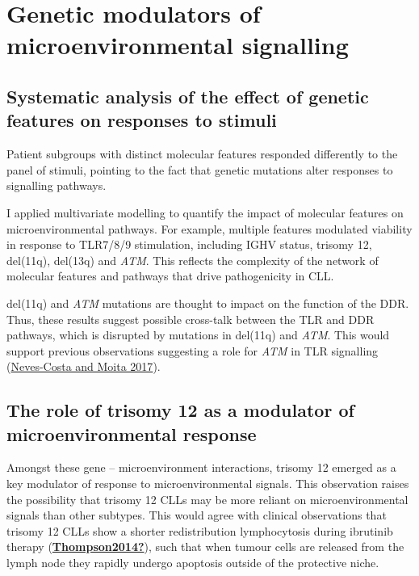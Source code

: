 \documentclass[11pt, a4paper, twosided]{book}
\begin{document}
\hypertarget{genetic-modulators-of-microenvironmental-signalling}{%
\section{Genetic modulators of microenvironmental signalling}\label{genetic-modulators-of-microenvironmental-signalling}}

\hypertarget{systematic-analysis-of-the-effect-of-genetic-features-on-responses-to-stimuli-1}{%
\subsection{Systematic analysis of the effect of genetic features on responses to stimuli}\label{systematic-analysis-of-the-effect-of-genetic-features-on-responses-to-stimuli-1}}

Patient subgroups with distinct molecular features responded differently to the panel of stimuli, pointing to the fact that genetic mutations alter responses to signalling pathways.

I applied multivariate modelling to quantify the impact of molecular features on microenvironmental pathways. For example, multiple features modulated viability in response to TLR7/8/9 stimulation, including IGHV status, trisomy 12, del(11q), del(13q) and \emph{ATM}. This reflects the complexity of the network of molecular features and pathways that drive pathogenicity in CLL.

del(11q) and \emph{ATM} mutations are thought to impact on the function of the DDR. Thus, these results suggest possible cross-talk between the TLR and DDR pathways, which is disrupted by mutations in del(11q) and \emph{ATM}. This would support previous observations suggesting a role for \emph{ATM} in TLR signalling (\protect\hyperlink{ref-Neves2017}{Neves-Costa and Moita 2017}).

\hypertarget{the-role-of-trisomy-12-as-a-modulator-of-microenvironmental-response}{%
\subsection{The role of trisomy 12 as a modulator of microenvironmental response}\label{the-role-of-trisomy-12-as-a-modulator-of-microenvironmental-response}}

Amongst these gene -- microenvironment interactions, trisomy 12 emerged as a key modulator of response to microenvironmental signals. This observation raises the possibility that trisomy 12 CLLs may be more reliant on microenvironmental signals than other subtypes. This would agree with clinical observations that trisomy 12 CLLs show a shorter redistribution lymphocytosis during ibrutinib therapy (\protect\hyperlink{ref-Thompson2014}{\textbf{Thompson2014?}}), such that when tumour cells are released from the lymph node they rapidly undergo apoptosis outside of the protective niche.
\end{document}
